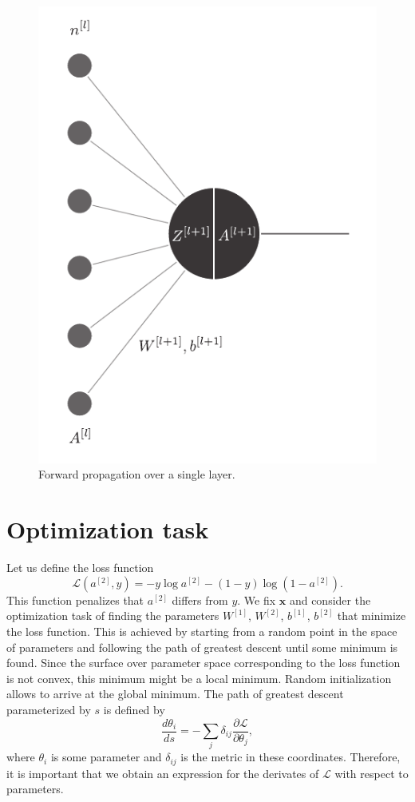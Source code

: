 \documentclass[aps,10pt]{revtex4}
\theoremstyle{plain}
\theoremstyle{definition}
\theoremstyle{remark}
\begin{document}
\begin{figure}
	\centering
	\includegraphics[width=0.5\linewidth]{nn_single_unit}
	\caption{Forward propagation over a single layer.}
	\label{fig:nnsingleunit}
\end{figure}

\section{Optimization task}
\noindent Let us define the loss function
\begin{equation}
\mathcal{L}(a^{[2]},y) = -y\log a^{[2]} - (1-y)\log\left(1-a^{[2]}\right).
\end{equation}
This function penalizes that $a^{[2]}$ differs from $y$. We fix $\mathbf{x}$ and consider the optimization task of finding the parameters $W^{[1]}$, $W^{[2]}$, $b^{[1]}$, $b^{[2]}$ that minimize the loss function. This is achieved by starting from a random point in the space of parameters and following the path of greatest descent until some minimum is found. Since the surface over parameter space corresponding to the loss function is not convex, this minimum might be a local minimum. Random initialization allows to arrive at the global minimum. The path of greatest descent parameterized by $s$ is defined by
\begin{equation}
 \frac{d\theta_i}{ds} = - \sum_j \delta_{ij}\frac{\partial\mathcal{L}}{\partial\theta_j},
\end{equation}
where $\theta_i$ is some parameter and $\delta_{ij}$ is the metric in these coordinates. Therefore, it is important that we obtain an expression for the derivates of $\mathcal{L}$ with respect to parameters.
\end{document}
